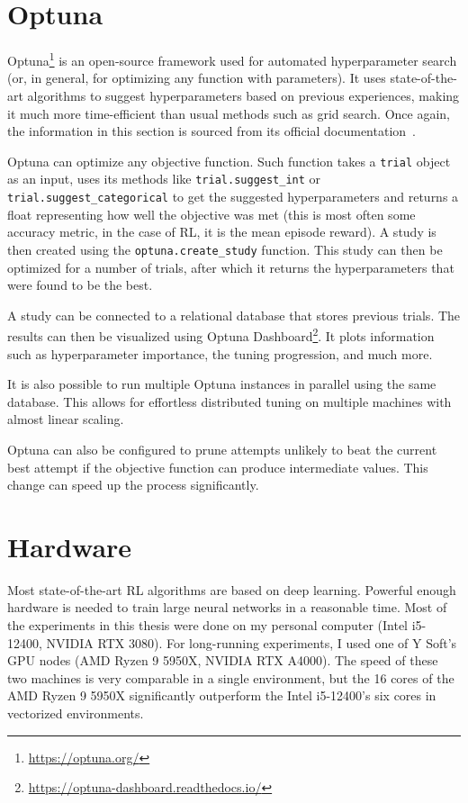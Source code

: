 \documentclass[
  digital,     %
  oneside,     %
  nosansbold,  %
  nocolorbold, %
  lof,         %
  lot,         %
]{fithesis4}
\begin{document}
\section{Optuna}
\label{sec:optuna}

Optuna\footnote{\url{https://optuna.org/}} is an open-source framework used for automated hyperparameter search (or, in general, for optimizing any function with parameters). It uses state-of-the-art algorithms to suggest hyperparameters based on previous experiences, making it much more time-efficient than usual methods such as grid search. Once again, the information in this section is sourced from its official documentation~\cite{optuna-docs}.

Optuna can optimize any objective function. Such function takes a \texttt{trial} object as an input, uses its methods like \texttt{trial.suggest\_int} or \texttt{trial.suggest\_categorical} to get the suggested hyperparameters and returns a float representing how well the objective was met (this is most often some accuracy metric, in the case of RL, it is the mean episode reward). A study is then created using the \texttt{optuna.create\_study} function. This study can then be optimized for a number of trials, after which it returns the hyperparameters that were found to be the best.

A study can be connected to a relational database that stores previous trials. The results can then be visualized using Optuna Dashboard\footnote{\url{https://optuna-dashboard.readthedocs.io/}}. It plots information such as hyperparameter importance, the tuning progression, and much more.

It is also possible to run multiple Optuna instances in parallel using the same database. This allows for effortless distributed tuning on multiple machines with almost linear scaling.

Optuna can also be configured to prune attempts unlikely to beat the current best attempt if the objective function can produce intermediate values. This change can speed up the process significantly.

\section{Hardware}

Most state-of-the-art RL algorithms are based on deep learning. Powerful enough hardware is needed to train large neural networks in a reasonable time. Most of the experiments in this thesis were done on my personal computer (Intel i5-12400, NVIDIA RTX 3080). For long-running experiments, I used one of Y Soft's GPU nodes (AMD Ryzen 9 5950X, NVIDIA RTX A4000). The speed of these two machines is very comparable in a single environment, but the 16 cores of the AMD Ryzen 9 5950X significantly outperform the Intel i5-12400's six cores in vectorized environments.
\end{document}
